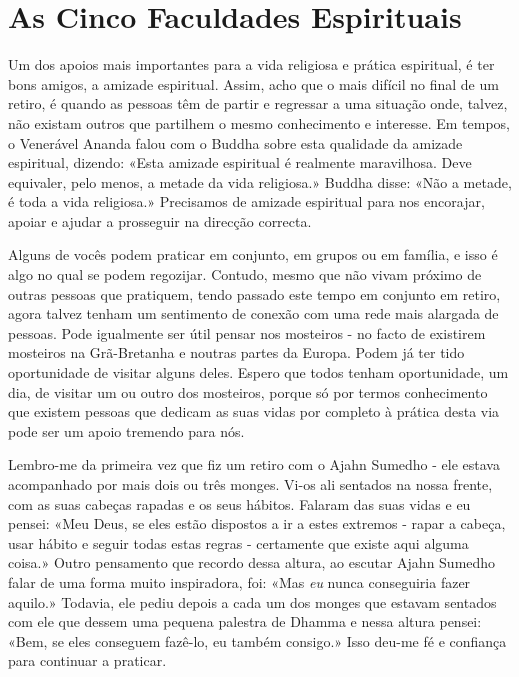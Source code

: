 \chapter{As Cinco Faculdades Espirituais}

Um dos apoios mais importantes para a vida religiosa e prática
espiritual, é ter bons amigos, a amizade espiritual. Assim, acho que o
mais difícil no final de um retiro, é quando as pessoas têm de partir e
regressar a uma situação onde, talvez, não existam outros que partilhem
o mesmo conhecimento e interesse. Em tempos, o Venerável Ananda falou
com o Buddha sobre esta qualidade da amizade espiritual, dizendo: «Esta
amizade espiritual é realmente maravilhosa. Deve equivaler, pelo menos,
a metade da vida religiosa.» Buddha disse: «Não a metade, é toda a vida
religiosa.» Precisamos de amizade espiritual para nos encorajar, apoiar
e ajudar a prosseguir na direcção correcta.

Alguns de vocês podem praticar em conjunto, em grupos ou em família, e
isso é algo no qual se podem regozijar. Contudo, mesmo que não vivam
próximo de outras pessoas que pratiquem, tendo passado este tempo em
conjunto em retiro, agora talvez tenham um sentimento de conexão com uma
rede mais alargada de pessoas. Pode igualmente ser útil pensar nos
mosteiros - no facto de existirem mosteiros na Grã-Bretanha e noutras
partes da Europa. Podem já ter tido oportunidade de visitar alguns
deles. Espero que todos tenham oportunidade, um dia, de visitar um ou
outro dos mosteiros, porque só por termos conhecimento que existem
pessoas que dedicam as suas vidas por completo à prática desta via pode
ser um apoio tremendo para nós.

Lembro-me da primeira vez que fiz um retiro com o Ajahn Sumedho - ele
estava acompanhado por mais dois ou três monges. Vi-os ali sentados na
nossa frente, com as suas cabeças rapadas e os seus hábitos. Falaram das
suas vidas e eu pensei: «Meu Deus, se eles estão dispostos a ir a estes
extremos - rapar a cabeça, usar hábito e seguir todas estas regras -
certamente que existe aqui alguma coisa.» Outro pensamento que recordo
dessa altura, ao escutar Ajahn Sumedho falar de uma forma muito
inspiradora, foi: «Mas \emph{eu} nunca conseguiria fazer aquilo.»
Todavia, ele pediu depois a cada um dos monges que estavam sentados com
ele que dessem uma pequena palestra de Dhamma e nessa altura pensei:
«Bem, se eles conseguem fazê-lo, eu também consigo.» Isso \mbox{deu-me} fé e
confiança para continuar a praticar.

